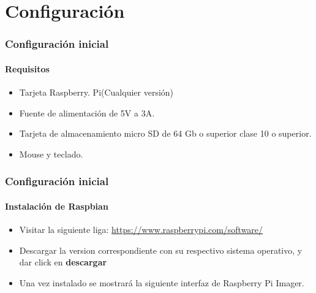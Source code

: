 \documentclass{beamer}
\begin{document}
	\section{Configuración}
	\begin{frame}
		\frametitle{Configuración inicial}
		\framesubtitle{Requisitos}
		
		\begin{tcolorbox}[enhanced, title= Material necesario:]
			\begin{itemize}
				\item Tarjeta Raspberry. Pi(Cualquier versión)
				\item Fuente de alimentación de 5V a 3A.
				\item Tarjeta de almacenamiento micro SD de 64 Gb o superior clase 10 o superior.
				\item Mouse y teclado.
			\end{itemize}
		\end{tcolorbox}
		
			
	\end{frame}

	\begin{frame}
		\frametitle{Configuración inicial}
		\framesubtitle{Instalación de Raspbian}
		
		\begin{tcolorbox}[enhanced, title= Instrucciones:]
				\begin{itemize}
					\item Visitar la siguiente liga: \url{https://www.raspberrypi.com/software/}
					\item Descargar la version correspondiente con su respectivo sistema operativo, y dar click en \textbf{descargar}
					\item Una vez instalado se mostrará la siguiente interfaz de Raspberry Pi Imager.
				\end{itemize}
		\end{tcolorbox}
		
		
	\end{frame}
	
\end{document}
